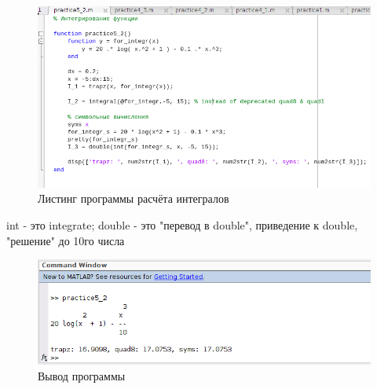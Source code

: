 \documentclass[12pt]{article}
\begin{document}
 \begin{figure}[!h]
 \includegraphics[width=\linewidth]{integr_setup.png}
 \caption{Листинг программы расчёта интегралов}
 \end{figure}
  int - это integrate; double - это "перевод в double", приведение к double, "решение" до 10го числа

\begin{figure}[!h]
 \includegraphics[width=\linewidth]{integr_output.png}
 \caption{Вывод программы}
\end{figure}
 
\end{document}
